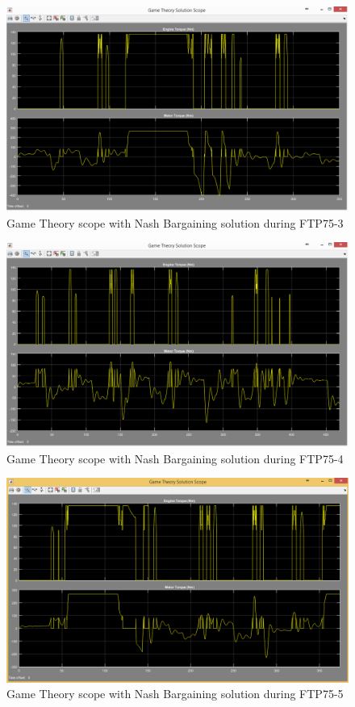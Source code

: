 \begin{figure}[h]
\centering
\includegraphics[scale=0.45]{figures/NashSolution/FTP75-3/gameTheory20Juni}
\caption{Game Theory scope with Nash Bargaining solution during FTP75-3}
\label{fig:gtns3}
\end{figure}

\begin{figure}[h]
\centering
\includegraphics[scale=0.45]{figures/NashSolution/FTP75-4/gameTheory21Juni}
\caption{Game Theory scope with Nash Bargaining solution during FTP75-4}
\label{fig:gtns4}
\end{figure}

\begin{figure}[h]
\centering
\includegraphics[scale=0.45]{figures/NashSolution/FTP75-5/gameTheory22Juni}
\caption{Game Theory scope with Nash Bargaining solution during FTP75-5}
\label{fig:gtns5}
\end{figure}


